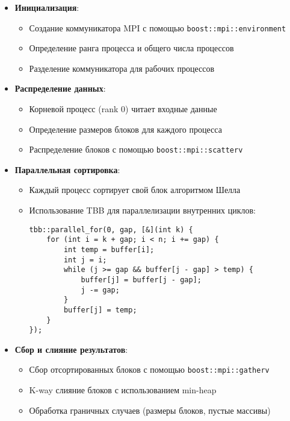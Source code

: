 \documentclass[a4paper,12pt]{article}
\begin{document}
\begin{itemize}
    \item \textbf{Инициализация}: 
    \begin{itemize}
        \item Создание коммуникатора MPI с помощью \texttt{boost::mpi::environment}
        \item Определение ранга процесса и общего числа процессов
        \item Разделение коммуникатора для рабочих процессов
    \end{itemize}

    \item \textbf{Распределение данных}:
    \begin{itemize}
        \item Корневой процесс (rank 0) читает входные данные
        \item Определение размеров блоков для каждого процесса
        \item Распределение блоков с помощью \texttt{boost::mpi::scatterv}
    \end{itemize}

    \item \textbf{Параллельная сортировка}:
    \begin{itemize}
        \item Каждый процесс сортирует свой блок алгоритмом Шелла
        \item Использование TBB для параллелизации внутренних циклов:
        \begin{lstlisting}
tbb::parallel_for(0, gap, [&](int k) {
    for (int i = k + gap; i < n; i += gap) {
        int temp = buffer[i];
        int j = i;
        while (j >= gap && buffer[j - gap] > temp) {
            buffer[j] = buffer[j - gap];
            j -= gap;
        }
        buffer[j] = temp;
    }
});
        \end{lstlisting}
    \end{itemize}

    \item \textbf{Сбор и слияние результатов}:
    \begin{itemize}
        \item Сбор отсортированных блоков с помощью \texttt{boost::mpi::gatherv}
        \item K-way слияние блоков с использованием min-heap
        \item Обработка граничных случаев (размеры блоков, пустые массивы)
    \end{itemize}
\end{itemize}
\end{document}
